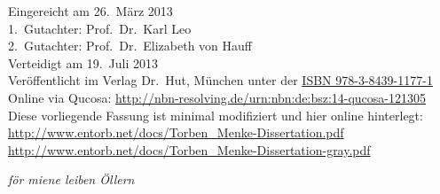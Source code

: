 \begin{titlepage}

\end{titlepage}
%
\vspace*{\fill}
Eingereicht am 26.\ März 2013
\vspace*{0.5em}\\1.\ Gutachter: Prof.\ Dr.\ Karl Leo
\vspace*{0.5em}\\2.\ Gutachter: Prof.\ Dr.\ Elizabeth von Hauff
\vspace*{0.5em}\\Verteidigt am 19.\ Juli 2013
\vspace*{1.5em}\\Veröffentlicht im Verlag Dr.\ Hut, München unter der 
 \href{http://www.dr.hut-verlag.de/9783843911771.html}{ISBN 978-3-8439-1177-1}
\vspace*{0.5em}\\Online via Qucosa: \url{http://nbn-resolving.de/urn:nbn:de:bsz:14-qucosa-121305}
\vspace*{0.5em}\\Diese vorliegende Fassung ist minimal modifiziert und hier online hinterlegt:
\\\url{http://www.entorb.net/docs/Torben_Menke-Dissertation.pdf}
\\\url{http://www.entorb.net/docs/Torben_Menke-Dissertation-gray.pdf}
\newpage
\vspace*{5cm}
\begin{center}
\textit{för miene leiben Öllern}
\end{center}
\newpage

